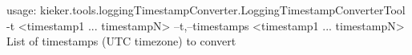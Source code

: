usage: kieker.tools.loggingTimestampConverter.LoggingTimestampConverterTool -t
       <timestamp1 ... timestampN>
 --t,--timestamps <timestamp1 ... timestampN>
        List of timestamps (UTC timezone) to convert